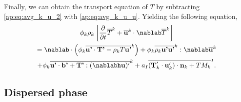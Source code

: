 Finally, we can obtain the transport equation of $T$ by subtracting \ref{ap:eq:avg_k_u_2} with \ref{ap:eq:avg_k_u_u}. 
Yielding the following equation, 
\begin{multline}
    \phi_k\rho_k  \left[
        \frac{\partial }{\partial t}
        \kavg{T}
        +\kavg{\textbf{u}}\cdot\nablab 
        \kavg{T}
    \right]\\
    =
    \nablab\cdot\left(
        \phi_k
        \kavg{\textbf{u'}\cdot \textbf{T'}
        - \rho_k T\textbf{u'}}
    \right)
    +\phi_k\kavg{\rho_k \textbf{u'u'}}:\nablab
         \kavg{\textbf{u}}\\
    +\phi_k\kavg{\textbf{u'}\cdot\textbf{b'} + \textbf{T'}: (\nablabh\textbf{u})'}
    +a_I \Iavg{
        (\textbf{T}_k'\cdot\textbf{u}'_k)\cdot\textbf{n}_k
        + T M_k}.
    \label{ap:eq:avg_k_T}
\end{multline}


\subsection*{Dispersed phase}

